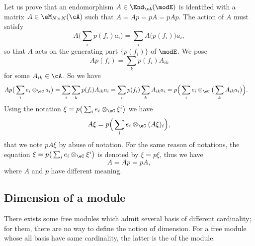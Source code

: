 Let us prove that an endomorphism $A\in\End_{\cA}(\modE)$ is identified with a matrix $A\in\eM_{N\times N}(\cA)$ such that $A=Ap=pA=pAp$. The action of $A$ must satisfy
\[ 
  A\big( \sum_ip(f_i)a_i \big)=\sum_iA\big( p(f_i) \big)a_i,
\]
so that $A$ acts on the generating part $\{ p(f_i) \}$ of $\modE$. We pose 
\begin{equation}
  Ap(f_i)=\sum_kp(f_i)A_{ik}
\end{equation}
for some $A_{ik}\in\cA$. So we have
\begin{align*}
  Ap\big( \sum_ie_i\otimes_{\eC}a_i \big)&=\sum_i\sum_kp(f_i)A_{ik}a_i
				=\sum_ip(f_i)\sum_kA_{ik}a_i
				=p\Big( \sum_ie_i\otimes_{\eC}\big( \sum_kA_{ik}a_i \big) \Big).
\end{align*}
Using the notation $\xi=p\big( \sum_ie_i\otimes_{\eC}\xi^i \big)$ we have
\begin{equation}
A\xi=p\Big( \sum_ie_i\otimes_{\eC}(A\xi)_i \Big),
\end{equation}
that we note $pA\xi$ by abuse of notation. For the same reason of notations, the equation $\xi=p\big( \sum_ie_i\otimes_{\eC}\xi^i \big)$ is denoted by $\xi=p\xi$, thus we have
\[ 
  A=Ap=pA,
\]
where $A$ and $p$ have different meaning.


\subsection{Dimension of a module} \label{subsec_DimofModule}

There exists some free modules which admit several basis of different cardinality; for them, there are no way to define the notion of dimension. For a free module whose all basis have same cardinality, the latter is the  of the module.

